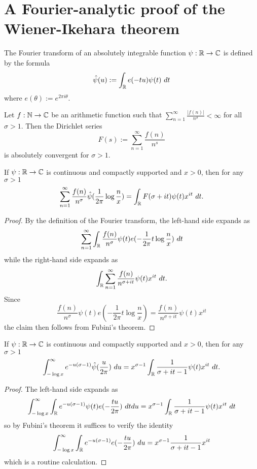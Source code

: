 \section{A Fourier-analytic proof of the Wiener-Ikehara theorem}

The Fourier transform of an absolutely integrable function $\psi: \R \to \C$ is defined by the formula
$$ \hat \psi(u) := \int_\R e(-tu) \psi(t)\ dt$$
where $e(\theta) := e^{2\pi i \theta}$.

Let $f: \N \to \C$ be an arithmetic function such that $\sum_{n=1}^\infty \frac{|f(n)|}{n^\sigma} < \infty$ for all $\sigma>1$.  Then the Dirichlet series
$$ F(s) := \sum_{n=1}^\infty \frac{f(n)}{n^s}$$
is absolutely convergent for $\sigma>1$.

\begin{lemma}\label{first-fourier}  If $\psi: \R \to \C$ is continuous and compactly supported and $x > 0$, then for any $\sigma>1$
  $$ \sum_{n=1}^\infty \frac{f(n)}{n^\sigma} \hat \psi( \frac{1}{2\pi} \log \frac{n}{x} ) = \int_\R F(\sigma + it) \psi(t) x^{it}\ dt.$$
\end{lemma}

\begin{proof}  By the definition of the Fourier transform, the left-hand side expands as
$$ \sum_{n=1}^\infty \int_\R \frac{f(n)}{n^\sigma} \psi(t) e( - \frac{1}{2\pi} t \log \frac{n}{x})\ dt$$
while the right-hand side expands as
$$ \int_\R \sum_{n=1}^\infty \frac{f(n)}{n^{\sigma+it}} \psi(t) x^{it}\ dt.$$
Since
$$\frac{f(n)}{n^\sigma} \psi(t) e( - \frac{1}{2\pi} t \log \frac{n}{x}) = \frac{f(n)}{n^{\sigma+it}} \psi(t) x^{it}$$
the claim then follows from Fubini's theorem.
\end{proof}

\begin{lemma}\label{second-fourier} If $\psi: \R \to \C$ is continuous and compactly supported and $x > 0$, then for any $\sigma>1$
$$ \int_{-\log x}^\infty e^{-u(\sigma-1)} \hat \psi(\frac{u}{2\pi})\ du = x^{\sigma - 1} \int_\R \frac{1}{\sigma+it-1} \psi(t) x^{it}\ dt.$$
\end{lemma}

\begin{proof}  The left-hand side expands as
  $$ \int_{-\log x}^\infty \int_\R e^{-u(\sigma-1)} \psi(t) e(-\frac{tu}{2\pi})\ dt du = x^{\sigma - 1} \int_\R \frac{1}{\sigma+it-1} \psi(t) x^{it}\ dt$$
  so by Fubini's theorem it suffices to verify the identity
$$ \int_{-\log x}^\infty \int_\R e^{-u(\sigma-1)} e(-\frac{tu}{2\pi})\ du = x^{\sigma - 1} \frac{1}{\sigma+it-1} x^{it}$$
which is a routine calculation.
\end{proof}

